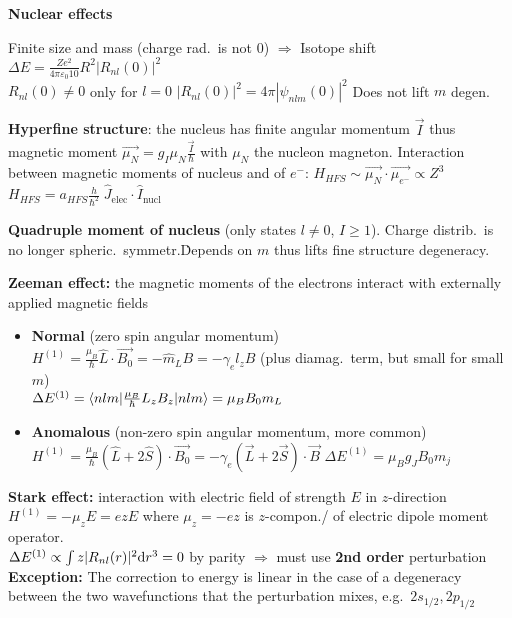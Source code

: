 \squishline

\textbf{Nuclear effects}
\begin{squishlist}
    \item Finite size and mass (charge rad.\ is not 0) $\Rightarrow$
    Isotope shift $\Delta E = \frac{Ze^2}{4 \pi \varepsilon_0 10}R^2 |R_{nl}(0)|^2$ \\ $R_{nl}(0) \neq 0$ only for $l=0$ \quad $|R_{nl}(0)|^2 = 4\pi |\psi_{nlm}(0)|^2$ \quad Does not lift $m$ degen.\
    \item \textbf{Hyperfine structure}: the nucleus has finite angular momentum $\vec{I}$ thus magnetic moment $\vec{\mu_N} = g_I \mu_N \frac{\vec{I}}{\hbar}$ with $\mu_N$ the nucleon magneton.
    Interaction between magnetic moments of nucleus and of $e^-$:
    $H_{HFS} \sim \vec{\mu_N}\cdot \vec{\mu_{e^-}} \propto Z^3$ \\
    $H_{HFS} = a_{HFS} \frac{h}{\hbar^2} \; \hat{J}_{\text{elec}}\cdot \hat{I}_{\text{nucl}}$
    \item \textbf{Quadruple moment of nucleus} (only states $l \neq 0$, $I \geq 1$). Charge distrib.\ is no longer spheric.\ symmetr.\. Depends on $m$ thus lifts fine structure degeneracy.
\end{squishlist}

\begin{squishlist}
    \item \textbf{Zeeman effect:} the magnetic moments of the electrons interact with externally applied magnetic fields
    \begin{itemize}
        \item \textbf{Normal} (zero spin angular momentum) \\
        $H^{(1)} = \frac{\mu_B}{\hbar} \hat{L}\cdot \vec{B_0} = - \hat{m}_L B = -\gamma_e l_z B$ (plus diamag.\ term, but small for small $m$) \\
        $\Delta E^{(1)} = \braket{nlm| \frac{\mu_B}{\hbar} L_z B_z |nlm} = \mu_B B_0 m_L$
        \item \textbf{Anomalous} (non-zero spin angular momentum, more common) \\
        $H^{(1)} = \frac{\mu_B}{\hbar}(\hat{L} + 2 \hat{S}) \cdot \vec{B_0}= -\gamma_e (\vec{L} + 2\vec{S}) \cdot \vec{B}$ \qquad
        $\Delta E^{(1)} = \mu_B g_J B_0 m_j$
    \end{itemize}

    \item \textbf{Stark effect:} interaction with electric field of strength $E$ in $z$-direction \\
    $H^{(1)} = - \mu_z E = e z E$ where $\mu_z = -e z$ is $z$-compon./ of electric dipole moment operator. \\
    $\Delta E^{(1)} \propto \int z |R_{nl}(r)|^2 \textrm{d} r^3 = 0$ by parity $\Longrightarrow$ must use \textbf{2nd order} perturbation \\
    \textbf{Exception:} The correction to energy is linear in the case of a degeneracy between the two wavefunctions that the perturbation mixes, e.g.\ $2s_{1/2}, 2p_{1/2}$
\end{squishlist}

